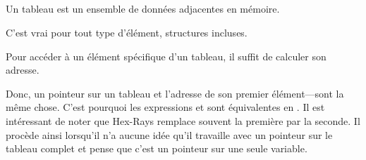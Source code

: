 ﻿\subsection{\Conclusion{}}

Un tableau est un ensemble de données adjacentes en mémoire.

C'est vrai pour tout type d'élément, structures incluses.

Pour accéder à un élément spécifique d'un tableau, il suffit de calculer son adresse.

Donc, un pointeur sur un tableau et l'adresse de son premier élément---sont la même
chose.
C'est pourquoi les expressions  et  sont équivalentes en \CCpp.
Il est intéressant de noter que Hex-Rays remplace souvent la première par la seconde.
Il procède ainsi lorsqu'il n'a aucune idée qu'il travaille avec un pointeur sur
le tableau complet et pense que c'est un pointeur sur une seule variable.
